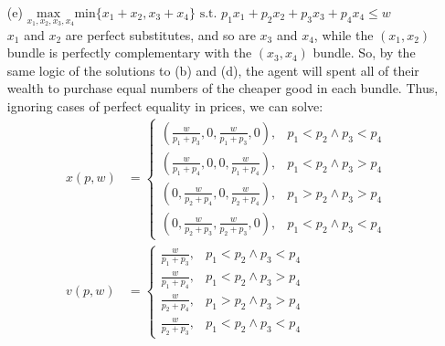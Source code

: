 \documentclass{article}
\newcommand{\usmax}[1]{\underset{#1}{\text{max }}}
\begin{document}
\begin{itemize}
	\pagebreak
	\item[(e)] $\usmax{x_1,x_2,x_3,x_4}\text{min}\{x_1+x_2,x_3+x_4\}\text{ s.t. }p_1x_1+p_2x_2+p_3x_3+p_4x_4\leq w$
		\medskip \\
		$x_1$ and $x_2$ are perfect substitutes, and so are $x_3$ and $x_4$, while the $(x_1,x_2)$ bundle is perfectly complementary with the $(x_3,x_4)$ bundle. So, by the same logic of the solutions to (b) and (d), the agent will spent all of their wealth to purchase equal numbers of the cheaper good in each bundle. Thus, ignoring cases of perfect equality in prices, we can solve:
		\begin{align*}
			x(p,w) &= 
					\begin{cases}
						\left(\frac{w}{p_1+p_3},0,\frac{w}{p_1+p_3},0\right), &p_1<p_2\land p_3<p_4 \\
						\left(\frac{w}{p_1+p_4},0,0,\frac{w}{p_1+p_4}\right), &p_1<p_2\land p_3>p_4 \\
						\left(0,\frac{w}{p_2+p_4},0,\frac{w}{p_2+p_4}\right), &p_1>p_2\land p_3>p_4 \\
						\left(0,\frac{w}{p_2+p_3},\frac{w}{p_2+p_3},0\right), &p_1<p_2\land p_3<p_4 
					\end{cases}	\\
			v(p,w) &= 
					\begin{cases}
						\frac{w}{p_1+p_3}, &p_1<p_2\land p_3<p_4 \\
						\frac{w}{p_1+p_4}, &p_1<p_2\land p_3>p_4 \\
						\frac{w}{p_2+p_4}, &p_1>p_2\land p_3>p_4 \\
						\frac{w}{p_2+p_3}, &p_1<p_2\land p_3<p_4 
					\end{cases}	\\
		\end{align*}
	

\end{itemize}
\end{document}
